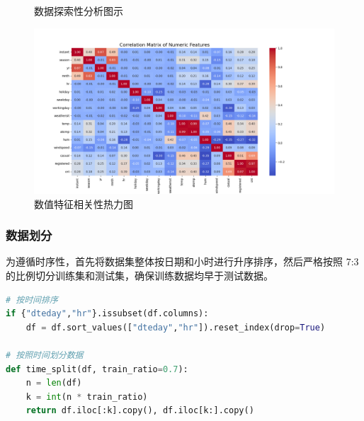 \documentclass[UTF8,a4paper,10pt]{ctexart}
\begin{document}
\begin{figure}[H]
    \centering
    \hfill
    \caption{数据探索性分析图示}
    \label{fig:eda_plots}
\end{figure}

\begin{figure}[H]
    \centering
    \includegraphics[width=0.9\linewidth]{pic/correlation_matrix.png}
    \caption{数值特征相关性热力图}
    \label{fig:corr_matrix}
\end{figure}


\subsubsection{数据划分}
为遵循时序性，首先将数据集整体按日期和小时进行升序排序，然后严格按照 7:3 的比例切分训练集和测试集，确保训练数据均早于测试数据。
\begin{lstlisting}[language=Python]
# 按时间排序
if {"dteday","hr"}.issubset(df.columns):
    df = df.sort_values(["dteday","hr"]).reset_index(drop=True)

# 按照时间划分数据
def time_split(df, train_ratio=0.7):
    n = len(df)
    k = int(n * train_ratio)
    return df.iloc[:k].copy(), df.iloc[k:].copy()
\end{lstlisting}
\end{document}
